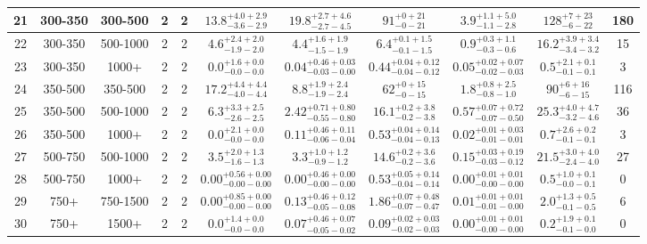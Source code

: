\documentclass[11pt, oneside]{article}
\begin{document}
\begin{table}
{\begin{tabular}{ |c|c|c|c|c||c|c|c|c||c|c| }
21 & 300-350 & 300-500 & 2 & 2 & $13.8^{+4.0+2.9}_{-3.6-2.9}$ & $19.8^{+2.7+4.6}_{-2.7-4.5}$ & $91^{+ 0+21}_{- 0-21}$ & $3.9^{+1.1+5.0}_{-1.1-2.8}$ & $128^{+ 7+23}_{- 6-22}$ & 180 \\ \hline
22 & 300-350 & 500-1000 & 2 & 2 & $4.6^{+2.4+2.0}_{-1.9-2.0}$ & $4.4^{+1.6+1.9}_{-1.5-1.9}$ & $6.4^{+0.1+1.5}_{-0.1-1.5}$ & $0.9^{+0.3+1.1}_{-0.3-0.6}$ & $16.2^{+3.9+3.4}_{-3.4-3.2}$ & 15 \\ \hline
23 & 300-350 & 1000+ & 2 & 2 & $0.0^{+1.6+0.0}_{-0.0-0.0}$ & $0.04^{+0.46+0.03}_{-0.03-0.00}$ & $0.44^{+0.04+0.12}_{-0.04-0.12}$ & $0.05^{+0.02+0.07}_{-0.02-0.03}$ & $0.5^{+2.1+0.1}_{-0.1-0.1}$ & 3 \\ \hline
24 & 350-500 & 350-500 & 2 & 2 & $17.2^{+4.4+4.4}_{-4.0-4.4}$ & $8.8^{+1.9+2.4}_{-1.9-2.4}$ & $62^{+ 0+15}_{- 0-15}$ & $1.8^{+0.8+2.5}_{-0.8-1.0}$ & $90^{+ 6+16}_{- 6-15}$ & 116 \\ \hline
25 & 350-500 & 500-1000 & 2 & 2 & $6.3^{+3.3+2.5}_{-2.6-2.5}$ & $2.42^{+0.71+0.80}_{-0.55-0.80}$ & $16.1^{+0.2+3.8}_{-0.2-3.8}$ & $0.57^{+0.07+0.72}_{-0.07-0.50}$ & $25.3^{+4.0+4.7}_{-3.2-4.6}$ & 36 \\ \hline
26 & 350-500 & 1000+ & 2 & 2 & $0.0^{+2.1+0.0}_{-0.0-0.0}$ & $0.11^{+0.46+0.11}_{-0.06-0.04}$ & $0.53^{+0.04+0.14}_{-0.04-0.13}$ & $0.02^{+0.01+0.03}_{-0.01-0.01}$ & $0.7^{+2.6+0.2}_{-0.1-0.1}$ & 3 \\ \hline
27 & 500-750 & 500-1000 & 2 & 2 & $3.5^{+2.0+1.3}_{-1.6-1.3}$ & $3.3^{+1.0+1.2}_{-0.9-1.2}$ & $14.6^{+0.2+3.6}_{-0.2-3.6}$ & $0.15^{+0.03+0.19}_{-0.03-0.12}$ & $21.5^{+3.0+4.0}_{-2.4-4.0}$ & 27 \\ \hline
28 & 500-750 & 1000+ & 2 & 2 & $0.00^{+0.56+0.00}_{-0.00-0.00}$ & $0.00^{+0.46+0.00}_{-0.00-0.00}$ & $0.53^{+0.05+0.14}_{-0.04-0.14}$ & $0.00^{+0.01+0.01}_{-0.00-0.00}$ & $0.5^{+1.0+0.1}_{-0.0-0.1}$ & 0 \\ \hline
29 & 750+ & 750-1500 & 2 & 2 & $0.00^{+0.85+0.00}_{-0.00-0.00}$ & $0.13^{+0.46+0.12}_{-0.05-0.08}$ & $1.86^{+0.07+0.48}_{-0.07-0.47}$ & $0.01^{+0.01+0.01}_{-0.01-0.00}$ & $2.0^{+1.3+0.5}_{-0.1-0.5}$ & 6 \\ \hline
30 & 750+ & 1500+ & 2 & 2 & $0.0^{+1.4+0.0}_{-0.0-0.0}$ & $0.07^{+0.46+0.07}_{-0.05-0.02}$ & $0.09^{+0.02+0.03}_{-0.02-0.03}$ & $0.00^{+0.01+0.01}_{-0.00-0.00}$ & $0.2^{+1.9+0.1}_{-0.1-0.0}$ & 0 \\ \hline
\end{tabular}}
\end{table}
\end{document}
